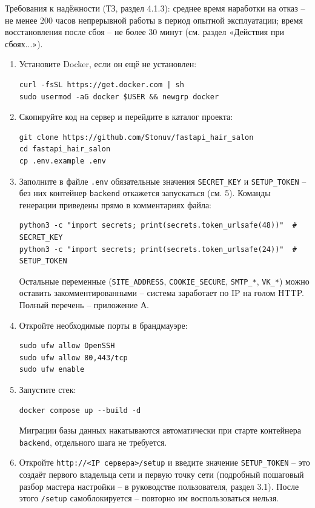 Требования к надёжности (ТЗ, раздел 4.1.3): среднее время наработки на
отказ -- не менее 200 часов непрерывной работы в период опытной
эксплуатации; время восстановления после сбоя -- не более 30 минут (см.
раздел «Действия при сбоях...»).



\begin{enumerate}
  \item Установите Docker, если он ещё не установлен:
\begin{verbatim}
curl -fsSL https://get.docker.com | sh
sudo usermod -aG docker $USER && newgrp docker
\end{verbatim}
  \item Скопируйте код на сервер и перейдите в каталог проекта:
\begin{verbatim}
git clone https://github.com/Stonuv/fastapi_hair_salon
cd fastapi_hair_salon
cp .env.example .env
\end{verbatim}
  \item Заполните в файле \texttt{.env} обязательные значения
        \texttt{SECRET\_KEY} и \texttt{SETUP\_TOKEN} -- без них контейнер
        \texttt{backend} откажется запускаться (см. 5). Команды
        генерации приведены прямо в комментариях файла:
\begin{verbatim}
python3 -c "import secrets; print(secrets.token_urlsafe(48))"  # SECRET_KEY
python3 -c "import secrets; print(secrets.token_urlsafe(24))"  # SETUP_TOKEN
\end{verbatim}
        Остальные переменные (\texttt{SITE\_ADDRESS}, \texttt{COOKIE\_SECURE},
        \texttt{SMTP\_*}, \texttt{VK\_*}) можно оставить закомментированными --
        система заработает по IP на голом HTTP. Полный перечень -- приложение А.
  \item Откройте необходимые порты в брандмауэре:
\begin{verbatim}
sudo ufw allow OpenSSH
sudo ufw allow 80,443/tcp
sudo ufw enable
\end{verbatim}
  \item Запустите стек:
\begin{verbatim}
docker compose up --build -d
\end{verbatim}
        Миграции базы данных накатываются автоматически при старте
        контейнера \texttt{backend}, отдельного шага не требуется.
  \item Откройте \texttt{http://<IP сервера>/setup} и введите значение
        \texttt{SETUP\_TOKEN} -- это создаёт первого владельца сети и
        первую точку сети (подробный пошаговый разбор мастера настройки --
        в руководстве пользователя, раздел 3.1). После этого
        \texttt{/setup} самоблокируется -- повторно им воспользоваться
        нельзя.
\end{enumerate}

